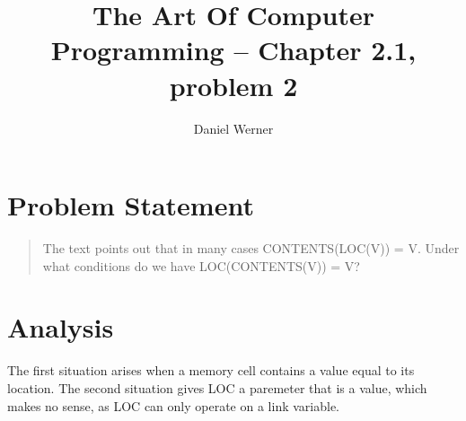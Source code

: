 \documentclass{article}
\title{The Art Of Computer Programming -- Chapter 2.1, problem 2}
\author{Daniel Werner}
\begin{document}
\maketitle

\section*{
    Problem Statement
}

\begin{quote}
  The text points out that in many cases CONTENTS(LOC(V)) = V. Under what conditions do we have LOC(CONTENTS(V)) = V?
\end{quote}

\section*{
    Analysis
}

The first situation arises when a memory cell contains a value equal to its location.  The second situation gives LOC a paremeter that is a value, which makes no sense, as LOC can only operate on a link variable.
\end{document}
